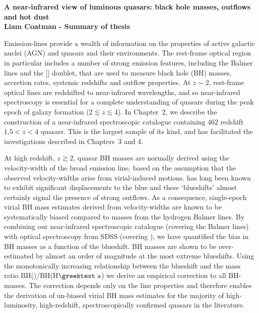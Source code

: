 \documentclass[a4paper,11pt]{article}
\newcommand\ion[2]{\text{#1\,\textsc{\lowercase{#2}}}}
\newcommand{\hans}{H$\textrm{\greektext a}$}
\begin{document}
\vspace*{-3cm}
\thispagestyle{plain}
\begin{center}
\textbf{\Large{A near-infrared view of luminous quasars: black hole masses, outflows and hot dust}}\\
\vspace{16pt}
\textbf{\large{Liam Coatman - Summary of thesis}}
\vspace{6pt}
\end{center}

Emission-lines provide a wealth of information on the properties of active galactic nuclei (AGN) and quasars and their environments. 
The rest-frame optical region in particular includes a number of strong emission features, including the Balmer lines and the [\ion{O}{III}] doublet, that are used to measure black hole (BH) masses, accretion rates, systemic redshifts and outflow properties. 
At $z\sim2$, rest-frame optical lines are redshifted to near-infrared wavelengths, and so near-infrared spectroscopy is essential for a complete understanding of quasars during the peak epoch of galaxy formation ($2 \lesssim z \lesssim 4$). 
In Chapter~2, we describe the construction of a near-infrared spectroscopic catalogue containing $462$ redshift $1.5 < z < 4$ quasars. 
This is the largest sample of its kind, and has facilitated the investigations described in Chapters~3 and 4.   

At high redshift, $z \gtrsim 2$, quasar BH masses are normally derived using the velocity-width of the \ion{C}{IV} broad emission line, based on the assumption that the observed velocity-widths arise from virial-induced motions.  
\ion{C}{IV} has long been known to exhibit significant displacements to the blue and these `blueshifts' almost certainly signal the presence of strong outflows.
As a consequence, single-epoch virial BH mass estimates derived from \ion{C}{IV} velocity-widths are known to be systematically biased compared to masses from the hydrogen Balmer lines.
By combining our near-infrared spectroscopic catalogue (covering the Balmer lines) with optical spectroscopy from SDSS (covering \ion{C}{IV}), we have quantified the bias in \ion{C}{IV} BH masses as a function of the \ion{C}{IV} blueshift. 
\ion{C}{IV} BH masses are shown to be over-estimated by almost an order of magnitude at the most extreme blueshifts.
Using the monotonically increasing relationship between the \ion{C}{IV} blueshift and the mass ratio BH(\ion{C}{IV})/BH(\hans) we derive an empirical correction to all \ion{C}{IV} BH-masses.
The correction depends only on the \ion{C}{IV} line properties and therefore enables the derivation of un-biased virial BH mass estimates for the majority of high-luminosity, high-redshift, spectroscopically confirmed quasars in the literature. 
\end{document}

